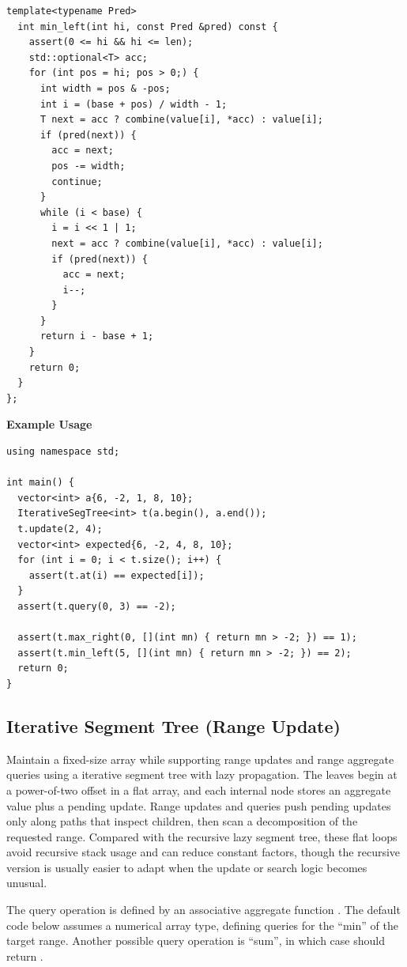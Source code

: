 \begin{lstlisting}[style=cpp]
  template<typename Pred>
  int min_left(int hi, const Pred &pred) const {
    assert(0 <= hi && hi <= len);
    std::optional<T> acc;
    for (int pos = hi; pos > 0;) {
      int width = pos & -pos;
      int i = (base + pos) / width - 1;
      T next = acc ? combine(value[i], *acc) : value[i];
      if (pred(next)) {
        acc = next;
        pos -= width;
        continue;
      }
      while (i < base) {
        i = i << 1 | 1;
        next = acc ? combine(value[i], *acc) : value[i];
        if (pred(next)) {
          acc = next;
          i--;
        }
      }
      return i - base + 1;
    }
    return 0;
  }
};
\end{lstlisting}
\textbf{Example Usage}\par
\begin{lstlisting}[style=cpp]
using namespace std;

int main() {
  vector<int> a{6, -2, 1, 8, 10};
  IterativeSegTree<int> t(a.begin(), a.end());
  t.update(2, 4);
  vector<int> expected{6, -2, 4, 8, 10};
  for (int i = 0; i < t.size(); i++) {
    assert(t.at(i) == expected[i]);
  }
  assert(t.query(0, 3) == -2);

  assert(t.max_right(0, [](int mn) { return mn > -2; }) == 1);
  assert(t.min_left(5, [](int mn) { return mn > -2; }) == 2);
  return 0;
}
\end{lstlisting}
\subsection{Iterative Segment Tree (Range Update)}
\label{sec:2.5.8}
Maintain a fixed-size array while supporting range updates and range aggregate queries using a iterative segment tree with lazy propagation. The leaves begin at a power-of-two offset in a flat array, and each internal node stores an aggregate value plus a pending update. Range updates and queries push pending updates only along paths that inspect children, then scan a decomposition of the requested range. Compared with the recursive lazy segment tree, these flat loops avoid recursive stack usage and can reduce constant factors, though the recursive version is usually easier to adapt when the update or search logic becomes unusual.

The query operation is defined by an associative aggregate function . The default code below assumes a numerical array type, defining queries for the ``min'' of the target range. Another possible query operation is ``sum'', in which case  should return .

